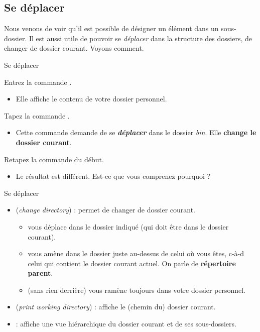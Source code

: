 \documentclass[a4paper,11pt]{style-esi/td}
\begin{document}
	\subsection{Se déplacer}

		Nous venons de voir qu'il est possible 
		de désigner un élément dans un sous-dossier.
		Il est aussi utile de pouvoir se \emph{déplacer} 
		dans la structure des dossiers, de changer de dossier courant.
		Voyons comment.

		\begin{Experience}{Se déplacer}  
			\vspace{-1em}
			\begin{steps}
			\item 
				Entrez la commande .
				\begin{itemize}
				\item 
					Elle affiche le contenu de votre dossier personnel.
				\end{itemize}
			\item 
				Tapez la commande .
				\begin{itemize}
				\item 
					Cette commande demande de se \textit{\textbf{déplacer}} 
					dans le dossier \textit{bin}.
					Elle \textbf{change le dossier courant}.
				\end{itemize}
			\item 
				Retapez la commande  du début.
				\begin{itemize}
				\item Le résultat est différent. 
					Est-ce que vous comprenez pourquoi ?
				\end{itemize}
			\end{steps}
		\end{Experience}
		
		\bigskip
		\begin{theorie}{Se déplacer}
			\begin{itemize}
			\item {} (\emph{change directory}) : permet de changer de dossier courant.
				\begin{itemize}
				\item {}
					vous déplace dans le dossier indiqué (qui doit être dans le dossier courant).
				\item {}
					vous amène dans le dossier juste au-dessus de celui où vous êtes, 
					c-à-d celui qui contient le dossier courant actuel.
					On parle de \textbf{répertoire parent}.
				\item {}
					(sans rien derrière) vous ramène toujours dans votre dossier personnel.
				\end{itemize}
			\item {} (\textit{print working directory})  :
				affiche le (chemin du) dossier courant.
			\item {} :
				affiche une vue hiérarchique du dossier courant et de ses sous-dossiers.
			\end{itemize}
		\end{theorie}
		
\end{document}
